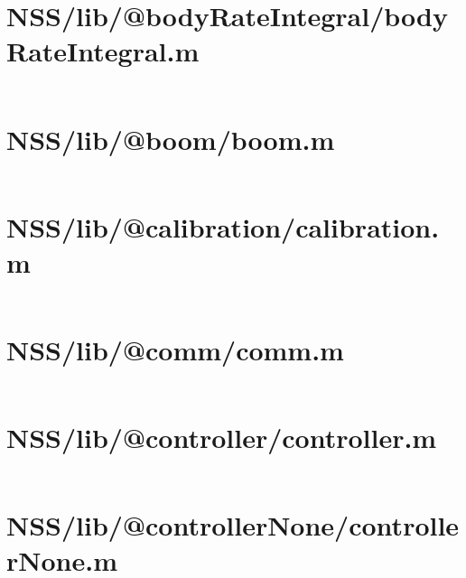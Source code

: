 \pagebreak
\section*{NSS/lib/@bodyRateIntegral/bodyRateIntegral.m}\label{code:NSS/lib/@bodyRateIntegral/bodyRateIntegral.m}
\inputminted[linenos,fontsize=\scriptsize]{matlab}{/home/dcouture/git/mathyourlife/TSatPy/beta_versions/matlab_object_oriented/lib/@bodyRateIntegral/bodyRateIntegral.m}

\pagebreak
\section*{NSS/lib/@boom/boom.m}\label{code:NSS/lib/@boom/boom.m}
\inputminted[linenos,fontsize=\scriptsize]{matlab}{/home/dcouture/git/mathyourlife/TSatPy/beta_versions/matlab_object_oriented/lib/@boom/boom.m}

\pagebreak
\section*{NSS/lib/@calibration/calibration.m}\label{code:NSS/lib/@calibration/calibration.m}
\inputminted[linenos,fontsize=\scriptsize]{matlab}{/home/dcouture/git/mathyourlife/TSatPy/beta_versions/matlab_object_oriented/lib/@calibration/calibration.m}

\pagebreak
\section*{NSS/lib/@comm/comm.m}\label{code:NSS/lib/@comm/comm.m}
\inputminted[linenos,fontsize=\scriptsize]{matlab}{/home/dcouture/git/mathyourlife/TSatPy/beta_versions/matlab_object_oriented/lib/@comm/comm.m}

\pagebreak
\section*{NSS/lib/@controller/controller.m}\label{code:NSS/lib/@controller/controller.m}
\inputminted[linenos,fontsize=\scriptsize]{matlab}{/home/dcouture/git/mathyourlife/TSatPy/beta_versions/matlab_object_oriented/lib/@controller/controller.m}

\pagebreak
\section*{NSS/lib/@controllerNone/controllerNone.m}\label{code:NSS/lib/@controllerNone/controllerNone.m}
\inputminted[linenos,fontsize=\scriptsize]{matlab}{/home/dcouture/git/mathyourlife/TSatPy/beta_versions/matlab_object_oriented/lib/@controllerNone/controllerNone.m}

